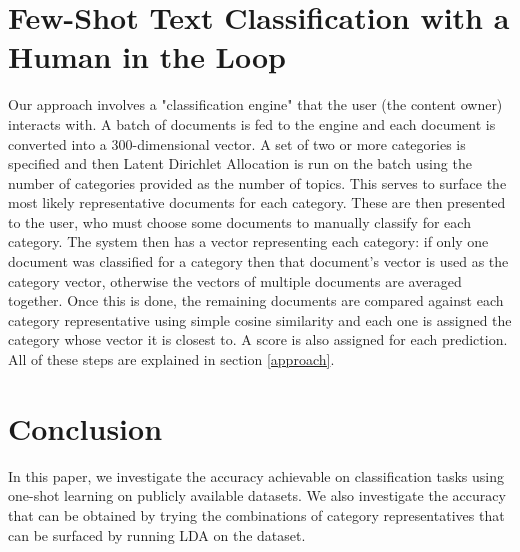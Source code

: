 \documentclass[11pt,letterpaper]{article}
\begin{document}
\section{Few-Shot Text Classification with a Human in the Loop}
Our approach involves a "classification engine" that the user (the content owner) interacts with. A batch of documents is fed to the engine and each document is converted into a 300-dimensional vector. A set of two or more categories is specified and then Latent Dirichlet Allocation is run on the batch using the number of categories provided as the number of topics. This serves to surface the most likely representative documents for each category. These are then presented to the user, who must choose some documents to manually classify for each category. The system then has a vector representing each category: if only one document was classified for a category then that document's vector is used as the category vector, otherwise the vectors of multiple documents are averaged together. Once this is done, the remaining documents are compared against each category representative using simple cosine similarity and each one is assigned the category whose vector it is closest to. A score is also assigned for each prediction. All of these steps are explained in section \ref{approach}.









\section{Conclusion}

In this paper, we investigate the accuracy achievable on classification tasks using one-shot learning on publicly available datasets. We also investigate the accuracy that can be obtained by trying the combinations of category representatives that can be surfaced by running LDA on the dataset.



\end{document}
